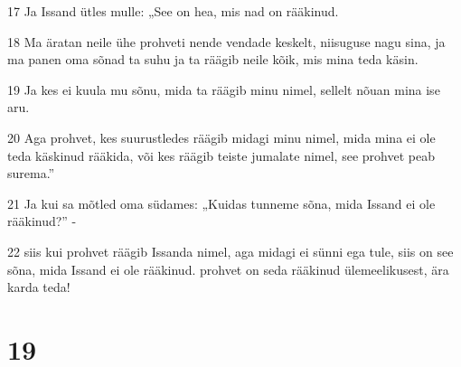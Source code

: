 \par 17 Ja Issand ütles mulle: „See on hea, mis nad on rääkinud.
\par 18 Ma äratan neile ühe prohveti nende vendade keskelt, niisuguse nagu sina, ja ma panen oma sõnad ta suhu ja ta räägib neile kõik, mis mina teda käsin.
\par 19 Ja kes ei kuula mu sõnu, mida ta räägib minu nimel, sellelt nõuan mina ise aru.
\par 20 Aga prohvet, kes suurustledes räägib midagi minu nimel, mida mina ei ole teda käskinud rääkida, või kes räägib teiste jumalate nimel, see prohvet peab surema.”
\par 21 Ja kui sa mõtled oma südames: „Kuidas tunneme sõna, mida Issand ei ole rääkinud?” -
\par 22 siis kui prohvet räägib Issanda nimel, aga midagi ei sünni ega tule, siis on see sõna, mida Issand ei ole rääkinud. prohvet on seda rääkinud ülemeelikusest, ära karda teda!

\chapter{19}


